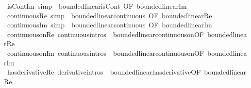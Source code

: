 \begin{isabellebody}
\isamarkupfalse%
\ isCont{\isacharunderscore}{\kern0pt}Im\ {\isacharbrackleft}{\kern0pt}simp{\isacharbrackright}{\kern0pt}\ {\isacharequal}{\kern0pt}\ bounded{\isacharunderscore}{\kern0pt}linear{\isachardot}{\kern0pt}isCont\ {\isacharbrackleft}{\kern0pt}OF\ bounded{\isacharunderscore}{\kern0pt}linear{\isacharunderscore}{\kern0pt}Im{\isacharbrackright}{\kern0pt}\isanewline
{}\isamarkupfalse%
\ continuous{\isacharunderscore}{\kern0pt}Re\ {\isacharbrackleft}{\kern0pt}simp{\isacharbrackright}{\kern0pt}\ {\isacharequal}{\kern0pt}\ bounded{\isacharunderscore}{\kern0pt}linear{\isachardot}{\kern0pt}continuous\ {\isacharbrackleft}{\kern0pt}OF\ bounded{\isacharunderscore}{\kern0pt}linear{\isacharunderscore}{\kern0pt}Re{\isacharbrackright}{\kern0pt}\isanewline
{}\isamarkupfalse%
\ continuous{\isacharunderscore}{\kern0pt}Im\ {\isacharbrackleft}{\kern0pt}simp{\isacharbrackright}{\kern0pt}\ {\isacharequal}{\kern0pt}\ bounded{\isacharunderscore}{\kern0pt}linear{\isachardot}{\kern0pt}continuous\ {\isacharbrackleft}{\kern0pt}OF\ bounded{\isacharunderscore}{\kern0pt}linear{\isacharunderscore}{\kern0pt}Im{\isacharbrackright}{\kern0pt}\isanewline
{}\isamarkupfalse%
\ continuous{\isacharunderscore}{\kern0pt}on{\isacharunderscore}{\kern0pt}Re\ {\isacharbrackleft}{\kern0pt}continuous{\isacharunderscore}{\kern0pt}intros{\isacharbrackright}{\kern0pt}\ {\isacharequal}{\kern0pt}\ bounded{\isacharunderscore}{\kern0pt}linear{\isachardot}{\kern0pt}continuous{\isacharunderscore}{\kern0pt}on{\isacharbrackleft}{\kern0pt}OF\ bounded{\isacharunderscore}{\kern0pt}linear{\isacharunderscore}{\kern0pt}Re{\isacharbrackright}{\kern0pt}\isanewline
{}\isamarkupfalse%
\ continuous{\isacharunderscore}{\kern0pt}on{\isacharunderscore}{\kern0pt}Im\ {\isacharbrackleft}{\kern0pt}continuous{\isacharunderscore}{\kern0pt}intros{\isacharbrackright}{\kern0pt}\ {\isacharequal}{\kern0pt}\ bounded{\isacharunderscore}{\kern0pt}linear{\isachardot}{\kern0pt}continuous{\isacharunderscore}{\kern0pt}on{\isacharbrackleft}{\kern0pt}OF\ bounded{\isacharunderscore}{\kern0pt}linear{\isacharunderscore}{\kern0pt}Im{\isacharbrackright}{\kern0pt}\isanewline
{}\isamarkupfalse%
\ has{\isacharunderscore}{\kern0pt}derivative{\isacharunderscore}{\kern0pt}Re\ {\isacharbrackleft}{\kern0pt}derivative{\isacharunderscore}{\kern0pt}intros{\isacharbrackright}{\kern0pt}\ {\isacharequal}{\kern0pt}\ bounded{\isacharunderscore}{\kern0pt}linear{\isachardot}{\kern0pt}has{\isacharunderscore}{\kern0pt}derivative{\isacharbrackleft}{\kern0pt}OF\ bounded{\isacharunderscore}{\kern0pt}linear{\isacharunderscore}{\kern0pt}Re{\isacharbrackright}{\kern0pt}\isanewline

\end{isabellebody}
